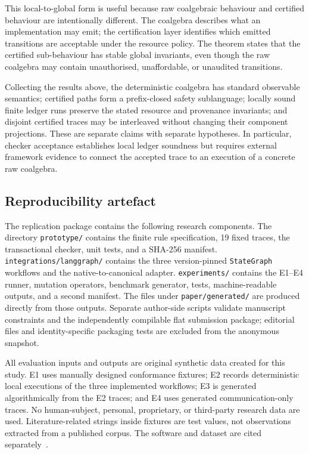 \documentclass[a4paper,fleqn]{cas-sc}
\begin{document}
This local-to-global form is useful because raw coalgebraic behaviour and certified behaviour are intentionally different. The coalgebra describes what an implementation may emit; the certification layer identifies which emitted transitions are acceptable under the resource policy. The theorem states that the certified sub-behaviour has stable global invariants, even though the raw coalgebra may contain unauthorised, unaffordable, or unaudited transitions.

Collecting the results above, the deterministic coalgebra has standard
observable semantics; certified paths form a prefix-closed safety sublanguage;
locally sound finite ledger runs preserve the stated resource and provenance
invariants; and disjoint certified traces may be interleaved without changing
their component projections. These are separate claims with separate
hypotheses. In particular, checker acceptance establishes local ledger
soundness but requires external framework evidence to connect the accepted
trace to an execution of a concrete raw coalgebra.

\subsection{Reproducibility artefact}

The replication package contains the following research components. The directory
\texttt{prototype/} contains the finite rule specification, 19 fixed traces,
the transactional checker, unit tests, and a SHA-256 manifest.
\texttt{integrations/langgraph/} contains the three version-pinned
\texttt{StateGraph} workflows and the native-to-canonical adapter.
\texttt{experiments/} contains the E1--E4 runner, mutation operators,
benchmark generator, tests, machine-readable outputs, and a second manifest.
The files under \texttt{paper/generated/} are produced directly from those
outputs. Separate author-side scripts validate manuscript constraints and the
independently compilable flat submission package; editorial files and
identity-specific packaging tests are excluded from the anonymous snapshot.

All evaluation inputs and outputs are original synthetic data created for this
study. E1 uses manually designed conformance fixtures; E2 records deterministic
local executions of the three implemented workflows; E3 is generated
algorithmically from the E2 traces; and E4 uses generated communication-only
traces. No human-subject, personal, proprietary, or third-party research data
are used. Literature-related strings inside fixtures are test values, not
observations extracted from a published corpus. The software and dataset are
cited separately~\cite{artifact2026,artifactdata2026}.
\end{document}
